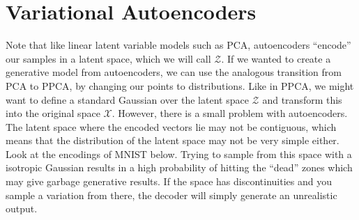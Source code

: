 \section{Variational Autoencoders}

  Note that like linear latent variable models such as PCA, autoencoders ``encode'' our samples in a latent space, which we will call $\mathcal{Z}$. If we wanted to create a generative model from autoencoders, we can use the analogous transition from PCA to PPCA, by changing our points to distributions. Like in PPCA, we might want to define a standard Gaussian over the latent space $\mathcal{Z}$ and transform this into the original space $\mathcal{X}$. However, there is a small problem with autoencoders. The latent space where the encoded vectors lie may not be contiguous, which means that the distribution of the latent space may not be very simple either. Look at the encodings of MNIST below. Trying to sample from this space with a isotropic Gaussian results in a high probability of hitting the ``dead'' zones which may give garbage generative results. If the space has discontinuities and you sample a variation from there, the decoder will simply generate an unrealistic output. 

